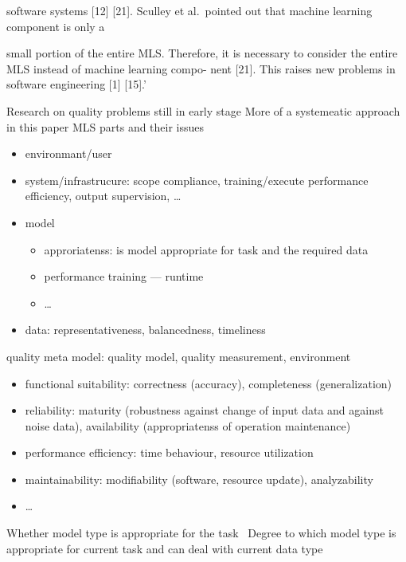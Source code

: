 software systems [12] [21]. Sculley et al.\ pointed out that machine learning component is only a

small portion of the entire \ac{MLS}. Therefore, it is necessary to consider the entire MLS instead
of machine learning compo- nent [21]. This raises new problems in software engineering [1] [15].'

Research on quality problems still in early stage
More of a systemeatic approach in this paper
MLS parts and their issues
\begin{itemize}
    \item environmant/user
    \item system/infrastrucure: scope compliance, training/execute performance efficiency, output
        supervision, \ldots
    \item model
        \begin{itemize}
            \item approriatenss: is model appropriate for task and the required data
            \item performance training --- runtime
            \item \ldots
        \end{itemize}
    \item data: representativeness, balancedness, timeliness
\end{itemize}
quality meta model: quality model, quality measurement, environment
\begin{itemize}
    \item functional suitability: correctness (accuracy), completeness (generalization)
    \item reliability: maturity (robustness against change of input data and against noise data),
        availability (appropriatenss of operation maintenance)
    \item performance efficiency: time behaviour, resource utilization
    \item maintainability: modifiability (software, resource update), analyzability
    \item \ldots
\end{itemize}


Whether model type is appropriate for the task~\cite{nakamichi_requirements-driven_2020}
Degree to which model type is appropriate for current task and can deal with current data
type~\cite{siebert_construction_2021}



